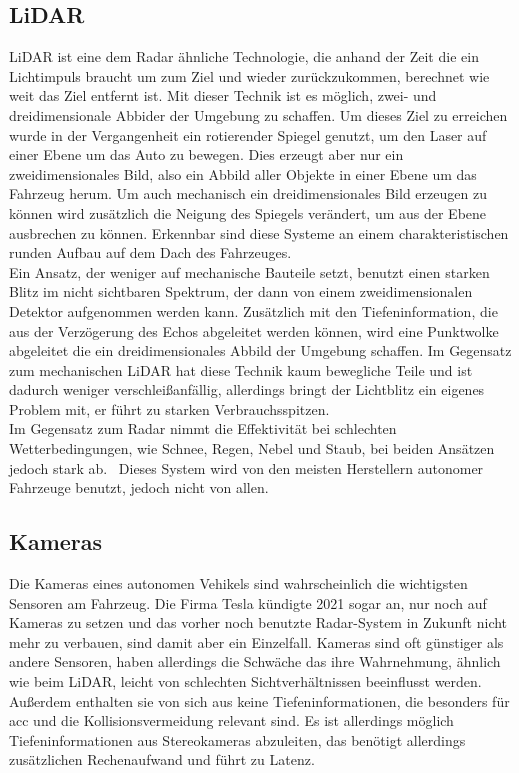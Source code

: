 \documentclass[conference,compsoc,final,a4paper]{IEEEtran}
\begin{document}
\subsection{LiDAR}

\ac{LiDAR} ist eine dem Radar ähnliche Technologie, die anhand der Zeit die ein Lichtimpuls braucht um zum Ziel und wieder zurückzukommen, berechnet wie weit das Ziel entfernt ist.
Mit dieser Technik ist es möglich, zwei- und dreidimensionale Abbider der Umgebung zu schaffen.
Um dieses Ziel zu erreichen wurde in der Vergangenheit ein rotierender Spiegel genutzt, um den Laser auf einer Ebene um das Auto zu bewegen.
Dies erzeugt aber nur ein zweidimensionales Bild, also ein Abbild aller Objekte in einer Ebene um das Fahrzeug herum.
Um auch mechanisch ein dreidimensionales Bild erzeugen zu können wird zusätzlich die Neigung des Spiegels verändert, um aus der Ebene ausbrechen zu können.
Erkennbar sind diese Systeme an einem charakteristischen runden Aufbau auf dem Dach des Fahrzeuges.\\
Ein Ansatz, der weniger auf mechanische Bauteile setzt, benutzt einen starken Blitz im nicht sichtbaren Spektrum, der dann von einem zweidimensionalen Detektor aufgenommen werden kann.
Zusätzlich mit den Tiefeninformation, die aus der Verzögerung des Echos abgeleitet werden können, wird eine Punktwolke abgeleitet die ein dreidimensionales Abbild der Umgebung
schaffen. Im Gegensatz zum mechanischen \ac{LiDAR} hat diese Technik kaum bewegliche Teile und ist dadurch weniger verschleißanfällig, allerdings bringt der Lichtblitz ein eigenes Problem mit,
er führt zu starken Verbrauchsspitzen.~\cite{Zhaohua2020}\\
Im Gegensatz zum Radar nimmt die Effektivität bei schlechten Wetterbedingungen, wie Schnee, Regen, Nebel und Staub, bei beiden Ansätzen jedoch stark ab.~\cite{Neal2018}
Dieses System wird von den meisten Herstellern autonomer Fahrzeuge benutzt, jedoch nicht von allen.~\cite{Dickson2021}

\subsection{Kameras}

Die Kameras eines autonomen Vehikels sind wahrscheinlich die wichtigsten Sensoren am Fahrzeug.
Die Firma Tesla kündigte 2021 sogar an, nur noch auf Kameras zu setzen und das vorher noch benutzte Radar-System in Zukunft nicht mehr zu verbauen, sind damit aber ein Einzelfall.\cite{Koellner2022}
Kameras sind oft günstiger als andere Sensoren, haben allerdings die Schwäche das ihre Wahrnehmung, ähnlich wie beim LiDAR, leicht von schlechten Sichtverhältnissen beeinflusst werden.
Außerdem enthalten sie von sich aus keine Tiefeninformationen, die besonders für \ac{acc} und die Kollisionsvermeidung relevant sind.
Es ist allerdings möglich Tiefeninformationen aus Stereokameras abzuleiten, das benötigt allerdings zusätzlichen Rechenaufwand und führt zu Latenz.~\cite{Petit2022}\par
\end{document}
